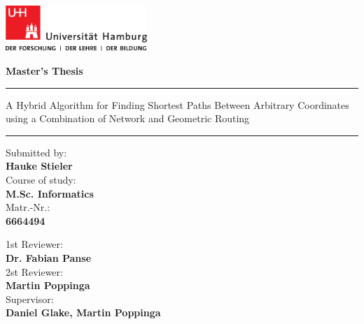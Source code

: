 
\pagenumbering{}

\begin{titlepage}
	
	\includegraphics[width=0.4\textwidth]{images/UHH-Logo_2010_Farbe_CMYK.pdf}
	\vspace{1cm}
	
	\begin{center}
		
		{
			\Large
			\textbf{Master's Thesis}
			\par
		}
		
		\vspace{1.5cm}
		\hrule
		\vspace{1cm}
		
		{
			\titlefont
			\huge
			A Hybrid Algorithm for Finding Shortest Paths Between Arbitrary Coordinates using a Combination of Network and Geometric Routing
			\par
		}
		
		\vspace{1cm}
		\hrule
		\vspace{1.5cm}
	\end{center}
	
	\begin{multicols}{2}
		\raggedright
		Submitted by:\\
		\textbf{Hauke Stieler}\\[1ex]
		Course of study:\\
		\textbf{M.Sc. Informatics}\\[1ex]
		Matr.-Nr.:\\
		\textbf{6664494}
		
		\columnbreak
		\raggedleft
		
		1st Reviewer:\\
		\textbf{Dr. Fabian Panse}\\[1ex]
		2st Reviewer:\\
		\textbf{Martin Poppinga}\\[1ex]
		Supervisor:\\
		\textbf{Daniel Glake, Martin Poppinga}
	\end{multicols}


\end{titlepage}

